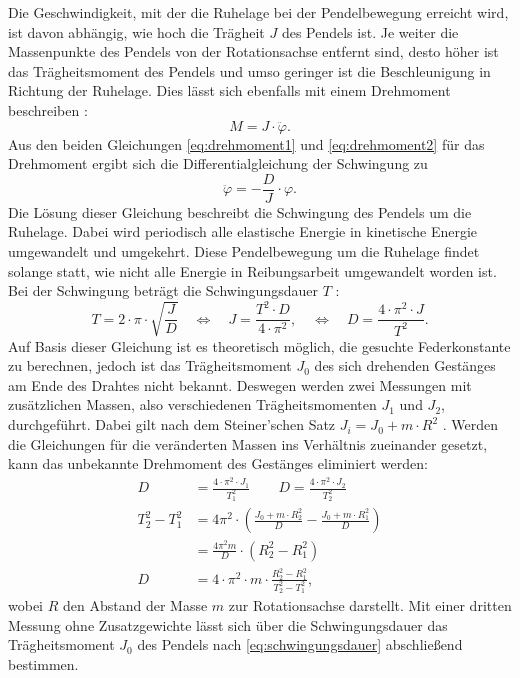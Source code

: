 Die Geschwindigkeit, mit der die Ruhelage bei der Pendelbewegung erreicht wird, ist davon abhängig, wie hoch die Trägheit $J$ des Pendels ist.
Je weiter die Massenpunkte des Pendels von der Rotationsachse entfernt sind, desto höher ist das Trägheitsmoment des Pendels und umso geringer ist die Beschleunigung in Richtung der Ruhelage.
Dies lässt sich ebenfalls mit einem Drehmoment beschreiben \cite{Westphal1971}:
\begin{equation}
    \label{eq:drehmoment2}
    M=J\cdot \ddot{\varphi}.
\end{equation}
Aus den beiden Gleichungen \eqref{eq:drehmoment1} und \eqref{eq:drehmoment2} für das Drehmoment ergibt sich die Differentialgleichung der Schwingung zu
\begin{equation}
    \ddot{\varphi} = -\frac{D}{J} \cdot \varphi .
\end{equation}
Die Lösung dieser Gleichung beschreibt die Schwingung des Pendels um die Ruhelage.
Dabei wird periodisch alle elastische Energie in kinetische Energie umgewandelt und umgekehrt.
Diese Pendelbewegung um die Ruhelage findet solange statt, wie nicht alle Energie in Reibungsarbeit umgewandelt worden ist.
Bei der Schwingung beträgt die Schwingungsdauer $T$ \cite{Tipler2015}:
\begin{equation}
    \label{eq:schwingungsdauer}
    T = 2 \cdot \pi \cdot \sqrt{\frac{J}{D}}
    \quad\Leftrightarrow\quad
    J = \frac{T^2 \cdot D}{4 \cdot \pi^2},
    \quad\Leftrightarrow\quad
    D = \frac{4 \cdot \pi^2 \cdot J}{T^2}.
\end{equation}
Auf Basis dieser Gleichung ist es theoretisch möglich, die gesuchte Federkonstante zu berechnen, jedoch ist das Trägheitsmoment $J_0$ des sich drehenden Gestänges am Ende des Drahtes nicht bekannt.
Deswegen werden zwei Messungen mit zusätzlichen Massen, also verschiedenen Trägheitsmomenten $J_1$ und $J_2$, durchgeführt.
Dabei gilt nach dem Steiner'schen Satz $J_i=J_0+m\cdot R^2$ \cite{Walcher2004}.
Werden die Gleichungen für die veränderten Massen ins Verhältnis zueinander gesetzt, kann das unbekannte Drehmoment des Gestänges eliminiert werden:
\begin{align}
    D &= \frac{4 \cdot \pi^2 \cdot J_1}{T_1^2} \quad\quad D = \frac{4 \cdot \pi^2 \cdot J_2}{T_2^2}\nonumber\\
    T_2^2 - T_1^2 &= 4 \pi^2 \cdot \left(\frac{J_0 + m \cdot R_2^2}{D} - \frac{J_0 + m \cdot R_1^2}{D}\right)\nonumber\\
    &= \frac{4 \pi^2 m}{D} \cdot \left(R_2^2 - R_1^2\right)\nonumber\\
    \label{eq:federkonstante}D &= 4 \cdot \pi^2 \cdot m \cdot \frac{R_2^2 - R_1^2}{T_2^2 - T_1^2},
\end{align}
wobei $R$ den Abstand der Masse $m$ zur Rotationsachse darstellt.
Mit einer dritten Messung ohne Zusatzgewichte lässt sich über die Schwingungsdauer das Trägheitsmoment $J_0$ des Pendels nach \eqref{eq:schwingungsdauer} abschließend bestimmen.
